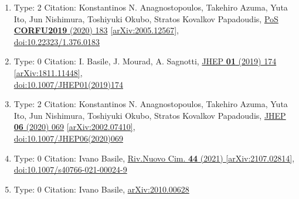 \documentclass[a4paper,10pt]{article}
\begin{document}
\begin{enumerate}
\begin{enumerate}
  \item Type: 2 Citation: Konstantinos N. Anagnostopoulos, Takehiro Azuma, Yuta Ito, Jun Nishimura, Toshiyuki Okubo, Stratos Kovalkov Papadoudis, \href{https://www.doi.org/10.22323/1.376.0183}{PoS {\bf CORFU2019} (2020) 183}  \href{https://arxiv.org/abs/2005.12567}{[arXiv:2005.12567]},\\\href{https://www.doi.org/10.22323/1.376.0183}{doi:10.22323/1.376.0183}
  \item Type: 0 Citation: I. Basile, J. Mourad, A. Sagnotti, \href{https://www.doi.org/10.1007/JHEP01(2019)174}{JHEP {\bf 01} (2019) 174}  \href{https://arxiv.org/abs/1811.11448}{[arXiv:1811.11448]},\\\href{https://www.doi.org/10.1007/JHEP01(2019)174}{doi:10.1007/JHEP01(2019)174}
  \item Type: 2 Citation: Konstantinos N. Anagnostopoulos, Takehiro Azuma, Yuta Ito, Jun Nishimura, Toshiyuki Okubo, Stratos Kovalkov Papadoudis, \href{https://www.doi.org/10.1007/JHEP06(2020)069}{JHEP {\bf 06} (2020) 069}  \href{https://arxiv.org/abs/2002.07410}{[arXiv:2002.07410]},\\\href{https://www.doi.org/10.1007/JHEP06(2020)069}{doi:10.1007/JHEP06(2020)069}
  \item Type: 0 Citation: Ivano Basile, \href{https://www.doi.org/10.1007/s40766-021-00024-9}{Riv.Nuovo Cim. {\bf 44} (2021) }  \href{https://arxiv.org/abs/2107.02814}{[arXiv:2107.02814]},\\\href{https://www.doi.org/10.1007/s40766-021-00024-9}{doi:10.1007/s40766-021-00024-9}
  \item Type: 0 Citation: Ivano Basile, \href{https://arxiv.org/abs/2010.00628}{arXiv:2010.00628}

\end{enumerate}
\end{enumerate}
\end{document}

